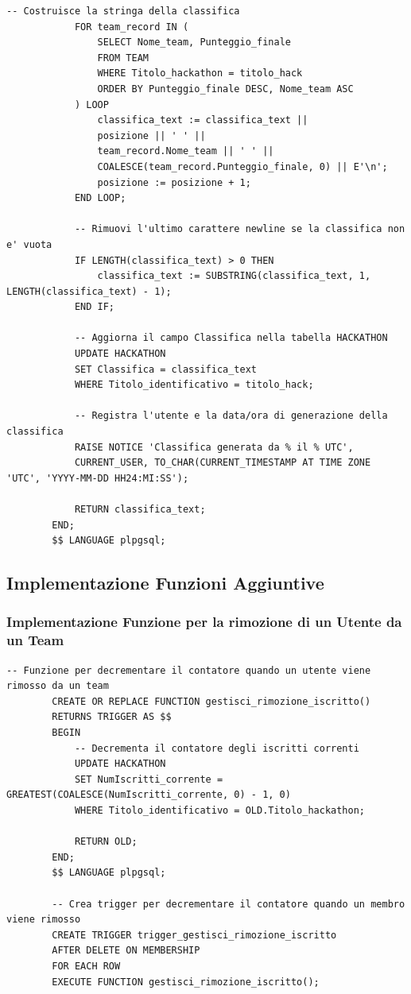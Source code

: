 \documentclass[a4paper, 11pt]{article}
\begin{document}
\begin{lstlisting}[style=sqlstyle]
			-- Costruisce la stringa della classifica
			FOR team_record IN (
				SELECT Nome_team, Punteggio_finale
				FROM TEAM
				WHERE Titolo_hackathon = titolo_hack
				ORDER BY Punteggio_finale DESC, Nome_team ASC
			) LOOP
				classifica_text := classifica_text || 
				posizione || ' ' || 
				team_record.Nome_team || ' ' || 
				COALESCE(team_record.Punteggio_finale, 0) || E'\n';
				posizione := posizione + 1;
			END LOOP;
			
			-- Rimuovi l'ultimo carattere newline se la classifica non e' vuota
			IF LENGTH(classifica_text) > 0 THEN
				classifica_text := SUBSTRING(classifica_text, 1, LENGTH(classifica_text) - 1);
			END IF;
			
			-- Aggiorna il campo Classifica nella tabella HACKATHON
			UPDATE HACKATHON
			SET Classifica = classifica_text
			WHERE Titolo_identificativo = titolo_hack;
			
			-- Registra l'utente e la data/ora di generazione della classifica
			RAISE NOTICE 'Classifica generata da % il % UTC', 
			CURRENT_USER, TO_CHAR(CURRENT_TIMESTAMP AT TIME ZONE 'UTC', 'YYYY-MM-DD HH24:MI:SS');
			
			RETURN classifica_text;
		END;
		$$ LANGUAGE plpgsql;
	\end{lstlisting}
	\subsection{Implementazione Funzioni Aggiuntive}
	\subsubsection{Implementazione Funzione per la rimozione di un Utente da un Team}
	\begin{lstlisting}[style=sqlstyle]
		-- Funzione per decrementare il contatore quando un utente viene rimosso da un team
		CREATE OR REPLACE FUNCTION gestisci_rimozione_iscritto()
		RETURNS TRIGGER AS $$
		BEGIN
			-- Decrementa il contatore degli iscritti correnti
			UPDATE HACKATHON
			SET NumIscritti_corrente = GREATEST(COALESCE(NumIscritti_corrente, 0) - 1, 0)
			WHERE Titolo_identificativo = OLD.Titolo_hackathon;
			
			RETURN OLD;
		END;
		$$ LANGUAGE plpgsql;
		
		-- Crea trigger per decrementare il contatore quando un membro viene rimosso
		CREATE TRIGGER trigger_gestisci_rimozione_iscritto
		AFTER DELETE ON MEMBERSHIP
		FOR EACH ROW
		EXECUTE FUNCTION gestisci_rimozione_iscritto();
	\end{lstlisting}
\end{document}
